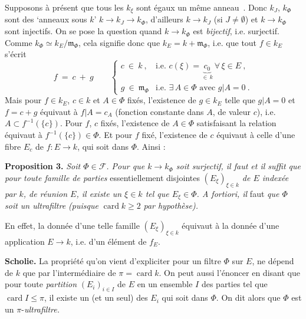 
Supposons à présent que tous les $k_\xi$ sont égaux un même anneau \,. Donc $k_J$, $k_\Phi$ sont des `anneaux sous $k$' $k\longrightarrow k_J\longrightarrow k_\Phi$, d'ailleurs $k\longrightarrow k_J$ (si $J\neq\emptyset$) et $k\longrightarrow k_\Phi$ sont injectifs. On se pose la question quand $k\longrightarrow k_\Phi$ est \textit{bijectif}, i.e. surjectif. Comme $k_\Phi\simeq k_E/\mathfrak{m}_\Phi$, cela signifie donc que $k_E=k+\mathfrak{m}_\Phi$, i.e. que tout $f\in k_E$ s'écrit
\[
f\ =\ c\ +\ g\qquad
\begin{cases}
c\ \in\ k\ , & \text{i.e. } c(\xi)=\underbrace{c_0}_{\in\,k}\ \forall\,\xi\in E\ ,\\[2ex]
g\ \in\ \mathfrak{m}_\Phi & \text{i.e. } \exists\,A\in\Phi \text{ avec } g|A=0\ .
\end{cases}
\]
Mais pour $f\in k_E$, $c\in k$ et $A\in\Phi$ fixés, l'existence de $g\in k_E$ telle que $g|A=0$ et $f=c+g$ équivaut à $f|A=c_A$ (fonction constante dans $A$, de valeur $c$), i.e. $A\subset f^{-1}(\{c\})$. Pour $f$, $c$ fixés, l'existence de $A\in\Phi$ satisfaisant la relation équivaut à $f^{-1}(\{c\})\in\Phi$. Et pour $f$ fixé, l'existence de $c$ équivaut à celle d'une fibre $E_c$ de $f:E\longrightarrow k$, qui soit dans $\Phi$. Ainsi :

\textbf{Proposition 3.} \textit{Soit $\Phi\in\mathcal{F}$. Pour que $k\longrightarrow k_\Phi$ soit surjectif, il faut et il suffit que pour toute famille de parties} essentiellement disjointes \textit{$(E_\xi)_{\xi\in k}$ de $E$ indexée par $k$, de réunion $E$, il existe un $\xi\in k$ tel que $E_\xi\in\Phi$. A fortiori, il} faut \textit{que $\Phi$ soit un ultrafiltre (puisque} $\operatorname{card}k\geqslant 2$ \textit{par hypothèse).}

En effet, la donnée d'une telle famille $(E_\xi)_{\xi\in k}$ équivaut à la donnée d'une application $E\longrightarrow k$, i.e. d'un élément de $f_E$. %

\textbf{Scholie.} La propriété qu'on vient d'expliciter pour un filtre $\Phi$ sur $E$, ne dépend de $k$ que par l'intermédiaire de $\pi=\operatorname{card}k$. On peut aussi l'énoncer en disant que pour toute \textit{partition} $(E_i)_{i\in I}$ de $E$ en un ensemble $I$ des parties tel que $\operatorname{card}I\leqslant\pi$, il existe un (et un seul) des $E_i$ qui soit dans $\Phi$. On dit alors que $\Phi$ est un $\pi$-\textit{ultrafiltre.}

